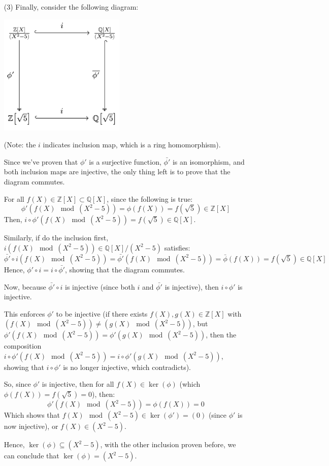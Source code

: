 \documentclass{article}
\begin{document}
\begin{itemize}
    \item[(3)] Finally, consider the following diagram:
    \begin{center}
        \includegraphics*[width=60mm]{commute 3 111b hw7.png}
    \end{center}
    (Note: the $i$ indicates inclusion map, which is a ring homomorphism).

    Since we've proven that $\phi'$ is a surjective function, $\bar{\phi'}$ is an isomorphism, and both inclusion maps are injective, the only thing left is to prove that the diagram commutes.

    For all $f(X)\in\mathbb{Z}[X]\subset \mathbb{Q}[X]$, since the following is true: 
    $$\phi'(f(X)\mod (X^2-5)) = \phi(f(X))=f(\sqrt{5})\in \mathbb{Z}[X]$$
    Then, $i\circ \phi'(f(X)\mod (X^2-5))=f(\sqrt{5})\in\mathbb{Q}[X]$.

    Similarly, if do the inclusion first, $i\left(f(X)\mod (X^2-5)\right)\in \mathbb{Q}[X]/(X^2-5)$ satisfies: 
    $$\bar{\phi'}\circ i\left(f(X)\mod (X^2-5)\right) = \bar{\phi'}(f(X)\mod (X^2-5)) = \bar{\phi}(f(X))=f(\sqrt{5})\in\mathbb{Q}[X]$$
    Hence, $\phi'\circ i = i\circ \bar{\phi'}$, showing that the diagram commutes.

    \hfil

    Now, because $\bar{\phi'}\circ i$ is injective (since both $i$ and $\bar{\phi'}$ is injective), then $i\circ \phi'$ is injective.
    
    This enforces $\phi'$ to be injective
    (if there exists $f(X),g(X)\in\mathbb{Z}[X]$ with $\left(f(X)\mod (X^2-5)\right)\neq \left(g(X)\mod (X^2-5)\right)$, but $\phi'\left(f(X)\mod (X^2-5)\right)=\phi'\left(g(X)\mod (X^2-5)\right)$,
    then the composition $i\circ\phi'\left(f(X)\mod (X^2-5)\right)=i\circ\phi'\left(g(X)\mod (X^2-5)\right)$, showing that $i\circ\phi'$ is no longer injective, which contradicts).

    So, since $\phi'$ is injective, then for all $f(X)\in \ker(\phi)$ (which $\phi(f(X))=f(\sqrt{5})=0$), then:
    $$\phi'(f(X)\mod (X^2-5))=\phi(f(X))=0$$
    Which shows that $f(X)\mod (X^2-5)\in \ker(\phi')=(0)$ (since $\phi'$ is now injective), or $f(X)\in (X^2-5)$.

    Hence, $\ker(\phi)\subseteq (X^2-5)$, with the other inclusion proven before, we can conclude that $\ker(\phi)=(X^2-5)$.
\end{itemize}
\end{document}
